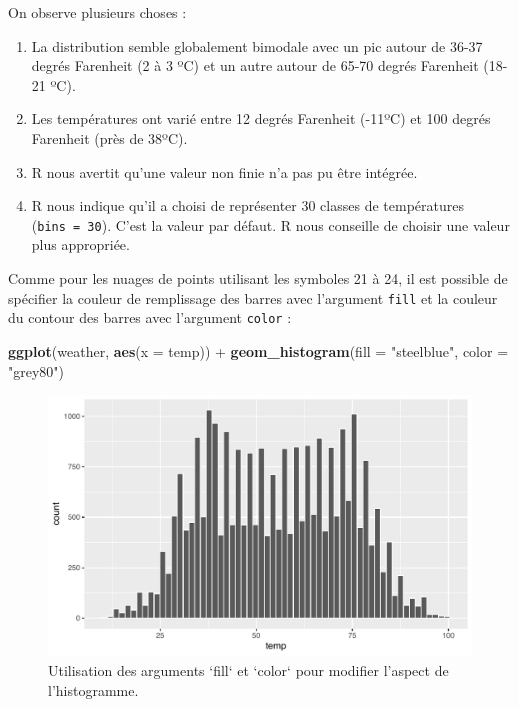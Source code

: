 \documentclass[a4paperpaper,]{article}
\newenvironment{Shaded}{\begin{snugshade}}{\end{snugshade}}
\newcommand{\DataTypeTok}[1]{\textcolor[rgb]{0.00,0.34,0.68}{#1}}
\newcommand{\KeywordTok}[1]{\textcolor[rgb]{0.12,0.11,0.11}{\textbf{#1}}}
\newcommand{\NormalTok}[1]{\textcolor[rgb]{0.12,0.11,0.11}{#1}}
\newcommand{\OperatorTok}[1]{\textcolor[rgb]{0.12,0.11,0.11}{#1}}
\newcommand{\StringTok}[1]{\textcolor[rgb]{0.75,0.01,0.01}{#1}}
\providecommand{\tightlist}{%
  \setlength{\itemsep}{0pt}\setlength{\parskip}{0pt}}
\begin{document}
On observe plusieurs choses :

\begin{enumerate}
\def\labelenumi{\arabic{enumi}.}
\tightlist
\item
  La distribution semble globalement bimodale avec un pic autour de 36-37 degrés Farenheit (2 à 3 ºC) et un autre autour de 65-70 degrés Farenheit (18-21 ºC).
\item
  Les températures ont varié entre 12 degrés Farenheit (-11ºC) et 100 degrés Farenheit (près de 38ºC).
\item
  R nous avertit qu'une valeur non finie n'a pas pu être intégrée.
\item
  R nous indique qu'il a choisi de représenter 30 classes de températures (\texttt{bins\ =\ 30}). C'est la valeur par défaut. R nous conseille de choisir une valeur plus appropriée.
\end{enumerate}

Comme pour les nuages de points utilisant les symboles 21 à 24, il est possible de spécifier la couleur de remplissage des barres avec l'argument \texttt{fill} et la couleur du contour des barres avec l'argument \texttt{color} :

\begin{Shaded}
\begin{Highlighting}[]
\KeywordTok{ggplot}\NormalTok{(weather, }\KeywordTok{aes}\NormalTok{(}\DataTypeTok{x =}\NormalTok{ temp)) }\OperatorTok{+}
\StringTok{  }\KeywordTok{geom_histogram}\NormalTok{(}\DataTypeTok{fill =} \StringTok{"steelblue"}\NormalTok{, }\DataTypeTok{color =} \StringTok{"grey80"}\NormalTok{)}
\end{Highlighting}
\end{Shaded}

\begin{figure}[htpb]

{\centering \includegraphics[width=0.9\linewidth]{figure/unnamed-chunk-48-1} 

}

\caption{Utilisation des arguments `fill` et `color` pour modifier l'aspect de l'histogramme.}\label{fig:unnamed-chunk-48}
\end{figure}
\end{document}
